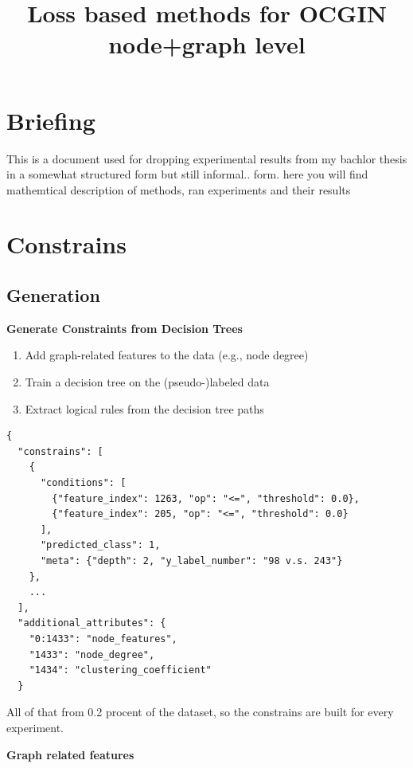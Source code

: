 \documentclass[a4paper,12pt]{article}
\title{Loss based methods for OCGIN node+graph level}
\begin{document}
\maketitle

\section{Briefing}

This is a document used for dropping experimental results from my bachlor thesis in a somewhat structured form but still informal.. form. here you will find mathemtical description of methods, ran experiments and their results

\section{Constrains}

\subsection{Generation}

\textbf{Generate Constraints from Decision Trees}
    \begin{enumerate}
        \item Add graph-related features to the data (e.g., node degree)
        \item Train a decision tree on the (pseudo-)labeled data
        \item Extract logical rules from the decision tree paths
    \end{enumerate}

\begin{small}
\begin{verbatim}
{
  "constrains": [
    {
      "conditions": [
        {"feature_index": 1263, "op": "<=", "threshold": 0.0},
        {"feature_index": 205, "op": "<=", "threshold": 0.0}
      ],
      "predicted_class": 1,
      "meta": {"depth": 2, "y_label_number": "98 v.s. 243"}
    },
    ...
  ],
  "additional_attributes": {
    "0:1433": "node_features",
    "1433": "node_degree",
    "1434": "clustering_coefficient"
  }

\end{verbatim}
\end{small}

All of that from 0.2 procent of the dataset, so the constrains are built for every experiment.

\textbf{Graph related features}
\end{document}
